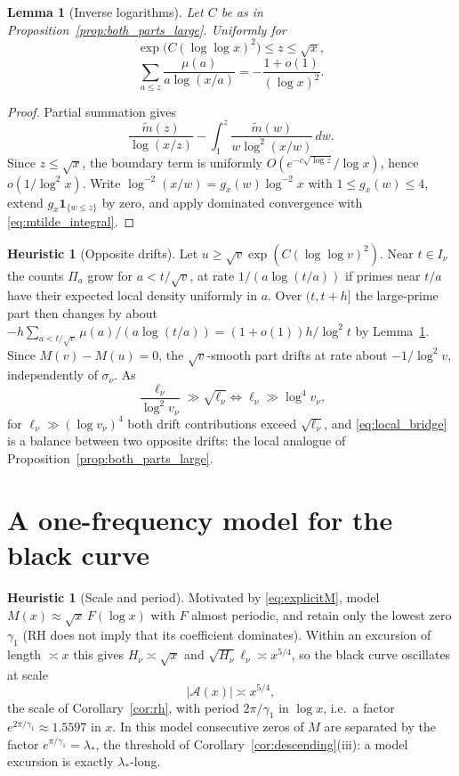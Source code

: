 \documentclass[11pt]{amsart}
\numberwithin{equation}{section}
\theoremstyle{plain}
\newtheorem{lemma}[theorem]{Lemma}
\theoremstyle{definition}
\newtheorem{heuristic}[theorem]{Heuristic}
\theoremstyle{remark}
\newcommand{\Anet}{\mathcal{A}}
\newcommand{\mt}{\widetilde{m}}
\begin{document}
\begin{lemma}[Inverse logarithms]
\label{lem:inverse_log_sum}
Let $C$ be as in Proposition~\ref{prop:both_parts_large}. Uniformly for
\[
\exp\bigl(C(\log\log x)^2\bigr)\le z\le\sqrt x,
\]
\begin{equation}
\label{eq:inverse_log_sum}
  \sum_{a\le z}\frac{\mu(a)}{a\log(x/a)}=-\frac{1+o(1)}{(\log x)^2}.
\end{equation}
\end{lemma}

\begin{proof}
Partial summation gives
\[
\frac{\mt(z)}{\log(x/z)}-
\int_1^z\frac{\mt(w)}{w\log^2(x/w)}\,dw.
\]
Since $z\le\sqrt x$, the boundary term is uniformly
$O(e^{-c\sqrt{\log z}}/\log x)$, hence $o(1/\log^2x)$. Write
$\log^{-2}(x/w)=g_x(w)\log^{-2}x$ with $1\le g_x(w)\le4$, extend
$g_x\mathbf1_{\{w\le z\}}$ by zero, and apply dominated convergence with
\eqref{eq:mtilde_integral}.
\end{proof}

\begin{heuristic}[Opposite drifts]
\label{heu:local_drift}
Let $u\ge\sqrt v\exp(C(\log\log v)^2)$. Near $t\in I_\nu$ the counts
$\Pi_a$ grow for $a<t/\sqrt v$, at rate $1/(a\log(t/a))$ if primes near
$t/a$ have their expected local density uniformly in $a$. Over $(t,t+h]$
the large-prime part then changes by about
$-h\sum_{a<t/\sqrt v}\mu(a)/(a\log(t/a))=(1+o(1))h/\log^2t$ by
Lemma~\ref{lem:inverse_log_sum}. Since $M(v)-M(u)=0$, the $\sqrt v$-smooth
part drifts at rate about $-1/\log^2v$, independently of $\sigma_\nu$. As
\[
\frac{\ell_\nu}{\log^2v_\nu}\gg\sqrt{\ell_\nu}
\iff
\ell_\nu\gg\log^4v_\nu,
\]
for $\ell_\nu\gg(\log v_\nu)^4$ both drift contributions exceed
$\sqrt{\ell_\nu}$, and \eqref{eq:local_bridge} is a balance between two
opposite drifts: the local analogue of
Proposition~\ref{prop:both_parts_large}.
\end{heuristic}

\section{A one-frequency model for the black curve}
\label{sec:model}

\begin{heuristic}[Scale and period]
\label{heu:model}
Motivated by \eqref{eq:explicitM}, model $M(x)\approx\sqrt x\,F(\log x)$
with $F$ almost periodic, and retain only the lowest zero $\gamma_1$ (RH
does not imply that its coefficient dominates). Within an excursion of
length $\asymp x$ this gives $H_\nu\asymp\sqrt x$ and
$\sqrt{H_\nu}\ell_\nu\asymp x^{5/4}$, so the black curve oscillates at scale
\begin{equation}
\label{eq:model_scale}
  |\Anet(x)|\asymp x^{5/4},
\end{equation}
the scale of Corollary~\ref{cor:rh}, with period $2\pi/\gamma_1$ in
$\log x$, i.e.\ a factor $e^{2\pi/\gamma_1}\approx1.5597$ in $x$. In this
model consecutive zeros of $M$ are separated by the factor
$e^{\pi/\gamma_1}=\lambda_*$, the threshold of
Corollary~\ref{cor:descending}(iii): a model excursion is exactly
$\lambda_*$-long.
\end{heuristic}
\end{document}
